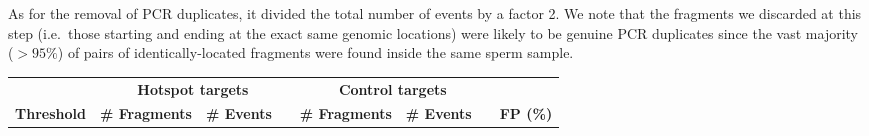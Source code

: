 As for the removal of PCR duplicates, it divided the total number of events by a factor 2.
We note that the fragments we discarded at this step (i.e.\ those starting and ending at the exact same genomic locations) were likely to be genuine PCR duplicates since the vast majority ($> 95\%$) of pairs of identically-located fragments were found inside the same sperm sample.



\begin{table}[t]
	\centering
	\begin{adjustbox}{width = 1\textwidth}
		\begin{tabular}{rrrrrrrr}
			\toprule
			\textbf{} & \multicolumn{3}{c}{\textbf{Hotspot targets}} & \multicolumn{3}{c}{\textbf{Control targets}} & \textbf{} \\
			\cmidrule(l){2-4} \cmidrule(l){5-7} 
			\textbf{Threshold} & \textbf{\# Fragments} & \textbf{\# Events} & \textbf{\textperthousand} & \textbf{\# Fragments} & \textbf{\# Events} & \textbf{\textperthousand} & \textbf{FP (\%)} \\



\end{tabular}
\end{adjustbox}
\end{table}
